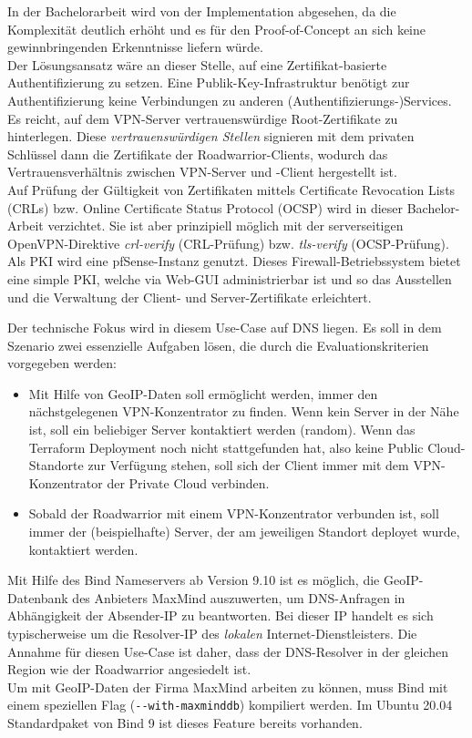 In der Bachelorarbeit wird von der Implementation abgesehen, da die Komplexität deutlich erhöht und es für den Proof-of-Concept an sich keine gewinnbringenden Erkenntnisse liefern würde.\\
Der Lösungsansatz wäre an dieser Stelle, auf eine Zertifikat-basierte Authentifizierung zu setzen. Eine Publik-Key-Infrastruktur benötigt zur Authentifizierung keine Verbindungen zu anderen (Authentifizierungs-)Services. Es reicht, auf dem VPN-Server vertrauenswürdige Root-Zertifikate zu hinterlegen. Diese \textit{vertrauenswürdigen Stellen} signieren mit dem privaten Schlüssel dann die Zertifikate der Roadwarrior-Clients, wodurch das Vertrauensverhältnis zwischen VPN-Server und -Client hergestellt ist.\\ 
Auf Prüfung der Gültigkeit von Zertifikaten mittels Certificate Revocation Lists (CRLs) bzw. Online Certificate Status Protocol (OCSP) wird in dieser Bachelor-Arbeit verzichtet. Sie ist aber prinzipiell möglich mit der serverseitigen OpenVPN-Direktive \textit{crl-verify} (CRL-Prüfung) bzw. \textit{tls-verify} (OCSP-Prüfung).\cite[S.116, S.325-327]{Keijser2011}\\
Als PKI wird eine pfSense-Instanz genutzt. Dieses Firewall-Betriebssystem bietet eine simple PKI, welche via Web-GUI administrierbar ist und so das Ausstellen und die Verwaltung der Client- und Server-Zertifikate erleichtert.\cite[S.376-383]{Netgate2020}

Der technische Fokus wird in diesem Use-Case auf DNS liegen. Es soll in dem Szenario zwei essenzielle Aufgaben lösen, die durch die Evaluationskriterien vorgegeben werden:
\begin{itemize}
\item Mit Hilfe von GeoIP-Daten soll ermöglicht werden, immer den nächstgelegenen VPN-Konzentrator zu finden. Wenn kein Server in der Nähe ist, soll ein beliebiger Server kontaktiert werden (random)\cite{bindrrset2020}. Wenn das Terraform Deployment noch nicht stattgefunden hat, also keine Public Cloud-Standorte zur Verfügung stehen, soll sich der Client immer mit dem VPN-Konzentrator der Private Cloud verbinden.
\item Sobald der Roadwarrior mit einem VPN-Konzentrator verbunden ist, soll immer der (beispielhafte) Server, der am jeweiligen Standort deployet wurde, kontaktiert werden.
\end{itemize}

Mit Hilfe des Bind Nameservers ab Version 9.10 ist es möglich, die GeoIP-Datenbank des Anbieters MaxMind auszuwerten, um DNS-Anfragen in Abhängigkeit der Absender-IP zu beantworten\cite{bindgeoip2020}. Bei dieser IP handelt es sich typischerweise um die Resolver-IP des \textit{lokalen} Internet-Dienstleisters. Die Annahme für diesen Use-Case ist daher, dass der DNS-Resolver in der gleichen Region wie der Roadwarrior angesiedelt ist\label{dns-resolver-region}.\\
Um mit GeoIP-Daten der Firma MaxMind arbeiten zu können, muss Bind mit einem speziellen Flag (\texttt{-{}-with-maxminddb}) kompiliert werden. Im Ubuntu 20.04 Standardpaket von Bind 9 ist dieses Feature bereits vorhanden.

